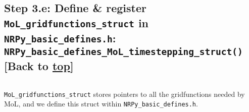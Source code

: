 \documentclass[landscape,letterpaper,10pt,english]{article}
\begin{document}
    \hypertarget{step-3.e-define-register-mol_gridfunctions_struct-in-nrpy_basic_defines.h-nrpy_basic_defines_mol_timestepping_struct-back-to-top}{%
\subsection{\texorpdfstring{Step 3.e: Define \& register
\texttt{MoL\_gridfunctions\_struct} in \texttt{NRPy\_basic\_defines.h}:
\texttt{NRPy\_basic\_defines\_MoL\_timestepping\_struct()} {[}Back to
\hyperref[toc]{top}{]}}{Step 3.e: Define \& register MoL\_gridfunctions\_struct in NRPy\_basic\_defines.h: NRPy\_basic\_defines\_MoL\_timestepping\_struct() {[}Back to {]}}}\label{step-3.e-define-register-mol_gridfunctions_struct-in-nrpy_basic_defines.h-nrpy_basic_defines_mol_timestepping_struct-back-to-top}}

\[\label{nrpybasicdefines}\]

\texttt{MoL\_gridfunctions\_struct} stores pointers to all the
gridfunctions needed by MoL, and we define this struct within
\texttt{NRPy\_basic\_defines.h}.
\end{document}
